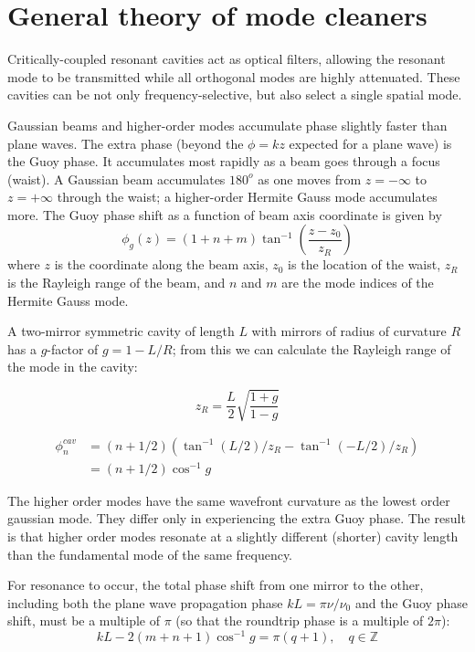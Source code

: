 \section{General theory of mode cleaners}

Critically-coupled resonant cavities act as optical filters, allowing
the resonant mode to be transmitted while all orthogonal modes are
highly attenuated.  These cavities can be not only
frequency-selective, but also select a single spatial mode.

Gaussian beams and higher-order modes accumulate phase slightly faster
than plane waves.  The extra phase (beyond the $\phi=kz$ expected for
a plane wave) is the Guoy phase.  It accumulates most rapidly as a
beam goes through a focus (waist). A Gaussian beam accumulates
$180^o$ as one moves from $z=-\infty$ to $z=+\infty$ through the
waist; a higher-order Hermite Gauss mode accumulates more.  The Guoy
phase shift as a function of beam axis coordinate is given by
%
\begin{equation}
\phi_g(z) = \left(1 + n + m\right) \tan^{-1} \left( \frac{z - z_0}{z_R} \right)
\label{eq:guoy-phase}
\end{equation}
%
where $z$ is the coordinate along the beam axis, $z_0$ is the location
of the waist, $z_R$ is the Rayleigh range of the beam, and $n$ and $m$
are the mode indices of the Hermite Gauss mode.

A two-mirror symmetric cavity of length $L$ with mirrors of radius of
curvature $R$ has a $g$-factor of $g = 1 - L/R$; from this we can
calculate the Rayleigh range of the mode in the cavity:

\begin{equation}
z_R = \frac{L}{2}\sqrt{\frac{1 + g}{1 - g}}
\end{equation}

\begin{align}
\phi^{cav}_n & =  \left(n+1/2\right)\left(\tan^{-1} (L/2)/z_R - \tan^{-1} (-L/2)/z_R\right) \\
            & = \left(n+1/2\right)\cos^{-1} g
\end{align}

The higher order modes have the same wavefront curvature as the lowest
order gaussian mode.  They differ only in experiencing the extra Guoy
phase.  The result is that higher order modes resonate at a slightly
different (shorter) cavity length than the fundamental mode of the
same frequency.

For resonance to occur, the total phase shift from one mirror to the
other, including both the plane wave propagation phase
$kL=\pi\nu/\nu_0$ and the Guoy phase shift, must be a multiple of
$\pi$ (so that the roundtrip phase is a multiple of $2\pi$):
%
\begin{equation}
kL - 2\left(m+n+1\right)\cos^{-1} g = \pi(q+1),
\quad q\in\mathbb{Z}
\end{equation}


